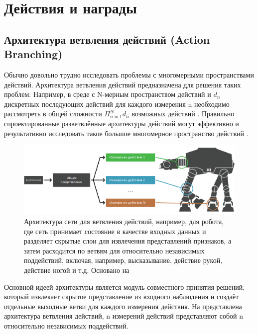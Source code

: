 \section{Действия и награды} \label{ch2:act-rew} %

\subsection{Архитектура ветвления действий (Action Branching)}

Обычно довольно трудно исследовать проблемы с многомерными пространствами действий. Архитектура ветвления действий предназначена для решения таких проблем. Например, в среде с N-мерным пространством действий и $d_n$ дискретных последующих действий для каждого измерения n необходимо рассмотреть в общей сложности $\Pi^N_{n=1} d_n$ возможных действий \cite{tavakoli2017action}. Правильно спроектированные разветвлённые архитектуры действий могут эффективно и результативно исследовать такое большое многомерное пространство действий \cite{tavakoli2017action}.

\begin{figure}[ht!]
    \center
    \includegraphics [scale=0.4] {my_folder/images/ch2/action-branching.png}
    \caption{Архитектура сети для ветвления действий, например, для робота, где сеть принимает состояние в качестве входных данных и разделяет скрытые слои для извлечения представлений признаков, а затем расходится по ветвям для относительно независимых поддействий, включая, например, высказывание, действие рукой, действие ногой и т.д. Основано на \cite{tavakoli2017action}}
    \label{fig:ch2-action-branching}
\end{figure}

Основной идеей архитектуры является модуль совместного принятия решений, который извлекает скрытое представление из входного наблюдения и создаёт отдельные выходные ветви для каждого измерения действия. На  представлена архитектура ветвления действий, n измерений действий представляют собой n относительно независимых поддействий.

